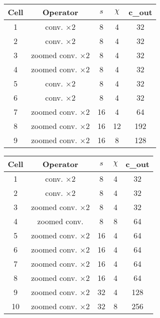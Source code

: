 \documentclass{article} \usepackage{iclr2020_conference,times}
\begin{document}
\begin{table*}[!htb]
\footnotesize
\caption{Cells used in FasterSeg. Left: cells for branch with final downsample rate of 16. Right: cells for branch with final downsample rate of 32. $s$: downsample rate. $\chi$: expansion ratio. c\_out: number of output channels.}
\begin{minipage}[t]{.45\linewidth}
\centering
\begin{tabular}{ccccc}
\toprule
Cell & Operator & $s$ & $\chi$ & c\_out \\ \midrule
1 & conv. $\times 2$ & 8 & 4 & 32 \\
2 & conv. $\times 2$ & 8 & 4 & 32 \\
3 & zoomed conv. $\times 2$ & 8 & 4 & 32 \\
4 & zoomed conv. $\times 2$ & 8 & 4 & 32 \\
5 & conv. $\times 2$ & 8 & 4 & 32 \\
6 & conv. $\times 2$ & 8 & 4 & 32 \\
7 & zoomed conv. $\times 2$ & 16 & 4 & 64 \\
8 & zoomed conv. $\times 2$ & 16 & 12 & 192 \\
9 & zoomed conv. $\times 2$ & 16 & 8 & 128 \\ \bottomrule
\end{tabular}
\end{minipage}\hfill \begin{minipage}[t]{.45\linewidth}
\centering
\begin{tabular}{ccccc}
\toprule
Cell & Operator & $s$ & $\chi$ & c\_out \\ \midrule
1 & conv. $\times 2$ & 8 & 4 & 32 \\
2 & conv. $\times 2$ & 8 & 4 & 32 \\
3 & zoomed conv. $\times 2$ & 8 & 4 & 32 \\
4 & zoomed conv. & 8 & 8 & 64 \\
5 & zoomed conv. $\times 2$ & 16 & 4 & 64 \\
6 & zoomed conv. $\times 2$ & 16 & 4 & 64 \\
7 & zoomed conv. $\times 2$ & 16 & 4 & 64 \\
8 & zoomed conv. $\times 2$ & 16 & 4 & 64 \\
9 & zoomed conv. $\times 2$ & 32 & 4 & 128 \\
10 & zoomed conv. $\times 2$ & 32 & 8 & 256 \\ \bottomrule
\end{tabular}
\end{minipage}\label{table:student}
\end{table*}
\end{document}
